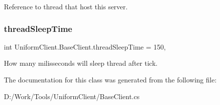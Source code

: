 Reference to thread that host this server. 

\mbox{\label{class_uniform_client_1_1_base_client_a2c4762c1be5eac42b8b5d189530d0952}} 
\subsubsection{\texorpdfstring{thread\+Sleep\+Time}{threadSleepTime}}
{\footnotesize\ttfamily int Uniform\+Client.\+Base\+Client.\+thread\+Sleep\+Time = 150\hspace{0.3cm}{\ttfamily [static]}, {\ttfamily [protected]}}



How many milisseconds will sleep thread after tick. 



The documentation for this class was generated from the following file\+:\begin{DoxyCompactItemize}
\item 
D\+:/\+Work/\+Tools/\+Uniform\+Client/Base\+Client.\+cs\end{DoxyCompactItemize}
